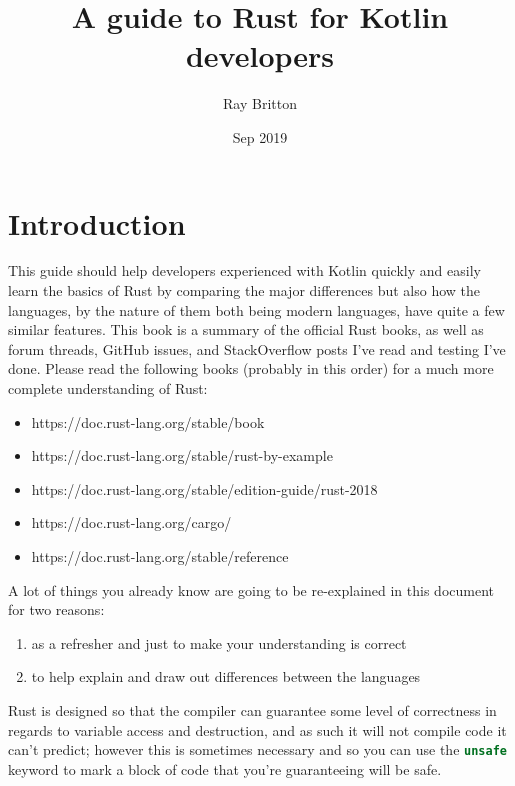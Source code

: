 \documentclass[a4paper,11pt]{article}
\begin{document}
\lstset{basicstyle=\ttfamily\footnotesize,breaklines=true}
\lstset{language=Rust, style=colouredRust}
\setlength{\parindent}{0mm}
\sffamily

\title{A guide to Rust for Kotlin developers}
\author{Ray Britton}
\date{Sep 2019}

\maketitle

\newpage
{}
\tableofcontents

\newpage
{}
\section{Introduction}

This guide should help developers experienced with Kotlin quickly and easily learn the basics of Rust by comparing the major differences but also how the languages, by the nature of them both being modern languages, have quite a few similar features.
\newline
\newline
This book is a summary of the official Rust books, as well as forum threads, GitHub issues, and StackOverflow posts I've read and testing I've done.
Please read the following books (probably in this order) for a much more complete understanding of Rust:
\begin{itemize}
  \item https://doc.rust-lang.org/stable/book
  \item https://doc.rust-lang.org/stable/rust-by-example
  \item https://doc.rust-lang.org/stable/edition-guide/rust-2018
  \item https://doc.rust-lang.org/cargo/
  \item https://doc.rust-lang.org/stable/reference
\end{itemize}
A lot of things you already know are going to be re-explained in this document for two reasons:
\begin{enumerate}
	\item as a refresher and just to make your understanding is correct
	\item to help explain and draw out differences between the languages
\end{enumerate}
Rust is designed so that the compiler can guarantee some level of correctness in regards to variable access and destruction, and as such it will not compile code it can't predict; however this is sometimes necessary and so you can use the \lstinline[language=Rust]{unsafe} keyword to mark a block of code that you're guaranteeing will be safe.
\end{document}
